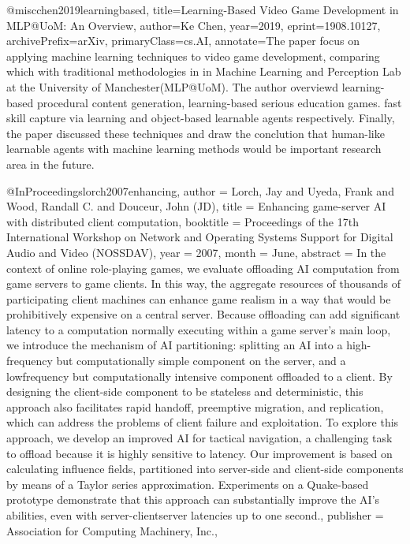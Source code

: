 @misc{chen2019learningbased,
    title={Learning-Based Video Game Development in MLP@UoM: An Overview},
    author={Ke Chen},
    year={2019},
    eprint={1908.10127},
    archivePrefix={arXiv},
    primaryClass={cs.AI},
    annotate={The paper focus on applying machine learning techniques to video game development, comparing which with traditional methodologies in in Machine Learning and Perception Lab at the University of Manchester(MLP@UoM). The author overviewd learning-based procedural content generation, learning-based serious education games. fast skill capture via learning and object-based learnable agents respectively. Finally, the paper discussed these techniques and draw the conclution that human-like learnable agents with machine learning methods would be important research area in the future.}
}

@InProceedings{lorch2007enhancing,
  author = {Lorch, Jay and Uyeda, Frank and Wood, Randall C. and Douceur, John (JD)},
  title = {Enhancing game-server AI with distributed client computation},
  booktitle = {Proceedings of the 17th International Workshop on Network and Operating Systems Support for Digital Audio and Video (NOSSDAV)},
  year = {2007},
  month = {June},
  abstract = {In the context of online role-playing games, we evaluate offloading AI computation from game servers to game clients. In this way, the aggregate resources of thousands of participating client machines can enhance game realism in a way that would be prohibitively expensive on a central server. Because offloading can add significant latency to a computation normally executing within a game server’s main loop, we introduce the mechanism of AI partitioning: splitting an AI into a high-frequency but computationally simple component on the server, and a lowfrequency but computationally intensive component offloaded to a client. By designing the client-side component to be stateless and deterministic, this approach also facilitates rapid handoff, preemptive migration, and replication, which can address the problems of client failure and exploitation. To explore this approach, we develop an improved AI for tactical navigation, a challenging task to offload because it is highly sensitive to latency. Our improvement is based on calculating influence fields, partitioned into server-side and client-side components by means of a Taylor series approximation. Experiments on a Quake-based prototype demonstrate that this approach can substantially improve the AI’s abilities, even with server-clientserver latencies up to one second.},
  publisher = {Association for Computing Machinery, Inc.},
}
